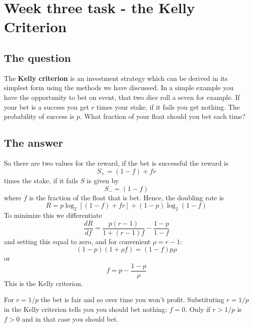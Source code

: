 \documentclass[12pt]{article}
\begin{document}
\section*{Week three task - the Kelly Criterion} 

\subsection*{The question}
 The \textbf{Kelly criterion} is an investment strategy which can be
 derived in its simplest form using the methods we have discussed. In
 a simple example you have the opportunity to bet on event, that two
 dice roll a seven for example. If your bet is a success you get
 $r${} times your stake, if it fails you get nothing. The
 probability of success is $p$. What fraction of your float
 should you bet each time?

 \newpage
 
\subsection*{The answer}
So there are two values for the reward, if the bet is successful the reward is
\begin{equation}
  S_+=(1-f)+fr
\end{equation}
times the stake, if it fails $S$ is given by
\begin{equation}
  S_-=(1-f)
\end{equation}
where $f$ is the fraction of the float that is bet. Hence, the doubling rate is
\begin{equation}
  R=p\log_2{[(1-f)+fr]}+(1-p)\log_2(1-f)
\end{equation}
To minimize this we differentiate
\begin{equation}
  \frac{dR}{df}=\frac{p(r-1)}{1+(r-1)f}-\frac{1-p}{1-f}
\end{equation}
and setting this equal to zero, and for convenient $\rho=r-1$:
\begin{equation}
  (1-p)(1+\rho f)=(1-f)p\rho
\end{equation}
or
\begin{equation}
  f=p-\frac{1-p}{\rho}
\end{equation}
This is the Kelly criterion.

For $r=1/p$ the bet is fair and so over time you won't
profit. Substituting $r=1/p$ in the Kelly criterion tells you you
should bet nothing: $f=0$. Only if $r>1/p$ is $f>0$ and in that case
you should bet.
\end{document}
